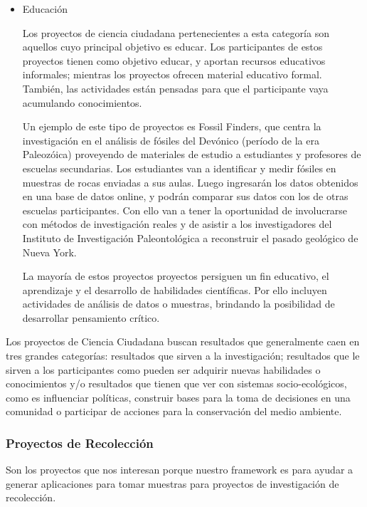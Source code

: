 \begin{itemize}
	\item {Educación} 
	
	Los proyectos de ciencia ciudadana pertenecientes a esta categoría son aquellos cuyo principal objetivo es educar. Los participantes de estos proyectos tienen como objetivo educar, y aportan recursos educativos informales; mientras los proyectos ofrecen material educativo formal. También, las actividades están pensadas para que el participante vaya acumulando conocimientos.
	
	Un ejemplo de este tipo de proyectos es Fossil Finders, que centra la investigación en el análisis de fósiles del Devónico (período de la era Paleozóica) proveyendo de materiales de estudio a estudiantes y profesores de escuelas secundarias. Los estudiantes van a identificar y medir fósiles en muestras de rocas enviadas a sus aulas. Luego ingresarán los datos obtenidos en una base de datos online, y podrán comparar sus datos con los de otras escuelas participantes. Con ello van a tener la oportunidad de involucrarse con métodos de investigación reales y de asistir a los investigadores del Instituto de Investigación Paleontológica a reconstruir el pasado geológico de Nueva York. \cite{FossilFinders}

	La mayoría de estos proyectos proyectos persiguen un fin educativo, el aprendizaje y el desarrollo de habilidades científicas. Por ello incluyen actividades de análisis de datos o muestras, brindando la posibilidad de desarrollar pensamiento crítico. 
	\end{itemize} 
	
	Los proyectos de Ciencia Ciudadana buscan resultados que generalmente caen en tres grandes categorías: resultados que sirven a la investigación; resultados que le sirven a los participantes como pueden ser adquirir nuevas habilidades o conocimientos y/o resultados que tienen que ver con sistemas socio-ecológicos, como es influenciar políticas, construir bases para la toma de decisiones en una comunidad o participar de acciones para la conservación del medio ambiente. \cite{shirk2012public}

\subsubsection{Proyectos de Recolección}	 
Son los proyectos que nos interesan porque nuestro framework es para ayudar a generar aplicaciones para tomar muestras para proyectos de investigación de recolección. 


